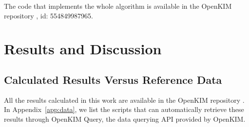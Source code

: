 \documentclass[%
 reprint,
 amsmath,amssymb,
 aps,
]{revtex4-1}
\begin{document}
The code that implements the whole algorithm is available in the OpenKIM repository \cite{openkim2016}, id: 554849987965.

\section{\label{sec:results}Results and Discussion}

\subsection{\label{sec:calcvsref}Calculated Results Versus Reference Data}

All the results calculated in this work are available in the OpenKIM repository \cite{openkim2016}.
In Appendix~\ref{app:data}, we list the scripts that can automatically retrieve these results through OpenKIM Query, the data querying API provided by OpenKIM.
\end{document}
